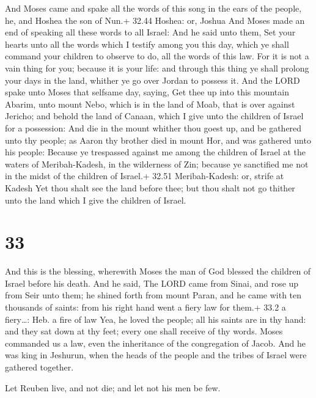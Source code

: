  And Moses came and spake all the words of this song in
the ears of the people, he, and Hoshea the son of Nun.+ 32.44 Hoshea:
or, Joshua  And Moses made an end of speaking all these
words to all Israel:  And he said unto them, Set your
hearts unto all the words which I testify among you this day, which ye
shall command your children to observe to do, all the words of this law.
 For it is not a vain thing for you; because it is your
life: and through this thing ye shall prolong your days in the land,
whither ye go over Jordan to possess it.  And the LORD
spake unto Moses that selfsame day, saying,  Get thee up
into this mountain Abarim, unto mount Nebo, which is in the land of
Moab, that is over against Jericho; and behold the land of Canaan, which
I give unto the children of Israel for a possession:  And
die in the mount whither thou goest up, and be gathered unto thy people;
as Aaron thy brother died in mount Hor, and was gathered unto his
people:  Because ye trespassed against me among the
children of Israel at the waters of Meribah-Kadesh, in the wilderness of
Zin; because ye sanctified me not in the midst of the children of
Israel.+ 32.51 Meribah-Kadesh: or, strife at Kadesh  Yet
thou shalt see the land before thee; but thou shalt not go thither unto
the land which I give the children of Israel.

\hypertarget{section-32}{%
\section{33}\label{section-32}}

 And this is the blessing, wherewith Moses the man of God
blessed the children of Israel before his death.  And he
said, The LORD came from Sinai, and rose up from Seir unto them; he
shined forth from mount Paran, and he came with ten thousands of saints:
from his right hand went a fiery law for them.+ 33.2 a fiery\ldots: Heb.
a fire of law  Yea, he loved the people; all his saints are
in thy hand: and they sat down at thy feet; every one shall receive of
thy words.  Moses commanded us a law, even the inheritance
of the congregation of Jacob.  And he was king in Jeshurun,
when the heads of the people and the tribes of Israel were gathered
together.

 Let Reuben live, and not die; and let not his men be few.

